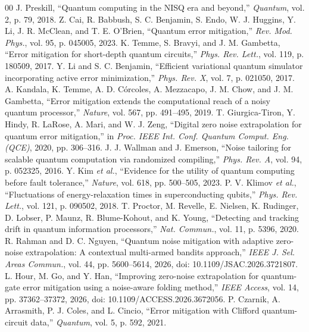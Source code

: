 \documentclass[conference]{IEEEtran}
\begin{document}
\begin{thebibliography}{00}
 J. Preskill, ``Quantum computing in the NISQ era and beyond,'' \textit{Quantum}, vol. 2, p. 79, 2018.
 Z. Cai, R. Babbush, S. C. Benjamin, S. Endo, W. J. Huggins, Y. Li, J. R. McClean, and T. E. O'Brien, ``Quantum error mitigation,'' \textit{Rev. Mod. Phys.}, vol. 95, p. 045005, 2023.
 K. Temme, S. Bravyi, and J. M. Gambetta, ``Error mitigation for short-depth quantum circuits,'' \textit{Phys. Rev. Lett.}, vol. 119, p. 180509, 2017.
 Y. Li and S. C. Benjamin, ``Efficient variational quantum simulator incorporating active error minimization,'' \textit{Phys. Rev. X}, vol. 7, p. 021050, 2017.
 A. Kandala, K. Temme, A. D. C\'orcoles, A. Mezzacapo, J. M. Chow, and J. M. Gambetta, ``Error mitigation extends the computational reach of a noisy quantum processor,'' \textit{Nature}, vol. 567, pp. 491--495, 2019.
 T. Giurgica-Tiron, Y. Hindy, R. LaRose, A. Mari, and W. J. Zeng, ``Digital zero noise extrapolation for quantum error mitigation,'' in \textit{Proc. IEEE Int. Conf. Quantum Comput. Eng. (QCE)}, 2020, pp. 306--316.
 J. J. Wallman and J. Emerson, ``Noise tailoring for scalable quantum computation via randomized compiling,'' \textit{Phys. Rev. A}, vol. 94, p. 052325, 2016.
 Y. Kim \textit{et al.}, ``Evidence for the utility of quantum computing before fault tolerance,'' \textit{Nature}, vol. 618, pp. 500--505, 2023.
 P. V. Klimov \textit{et al.}, ``Fluctuations of energy-relaxation times in superconducting qubits,'' \textit{Phys. Rev. Lett.}, vol. 121, p. 090502, 2018.
 T. Proctor, M. Revelle, E. Nielsen, K. Rudinger, D. Lobser, P. Maunz, R. Blume-Kohout, and K. Young, ``Detecting and tracking drift in quantum information processors,'' \textit{Nat. Commun.}, vol. 11, p. 5396, 2020.
 R. Rahman and D. C. Nguyen, ``Quantum noise mitigation with adaptive zero-noise extrapolation: A contextual multi-armed bandits approach,'' \textit{IEEE J. Sel. Areas Commun.}, vol. 44, pp. 5600--5614, 2026, doi: 10.1109/JSAC.2026.3721807.
 L. Hour, M. Go, and Y. Han, ``Improving zero-noise extrapolation for quantum-gate error mitigation using a noise-aware folding method,'' \textit{IEEE Access}, vol. 14, pp. 37362--37372, 2026, doi: 10.1109/ACCESS.2026.3672056.
 P. Czarnik, A. Arrasmith, P. J. Coles, and L. Cincio, ``Error mitigation with Clifford quantum-circuit data,'' \textit{Quantum}, vol. 5, p. 592, 2021.

\end{thebibliography}
\end{document}
